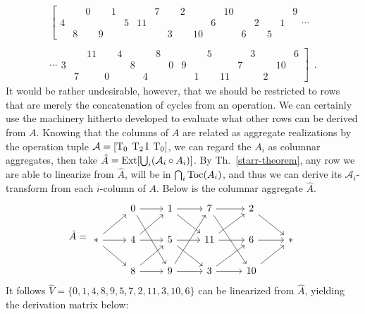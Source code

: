 \begin{example}
    \begin{multline}
        \left[
        \begin{array}{cccccccccccc|cccccc}
        	&& 0 && 1 &&& 7 && 2 && & 10 &&&&& 9 \\
        	4 &&&&& 5 & 11 &&&&& 6 & && 2 && 1 & \\
        	& 8 && 9 &&&&& 3 && 10 & & & 6 && 5 &&
        \end{array}
        \right. \cdots \\\\
        \cdots \left.
        \begin{array}{cccccc|cccccccccccc}
        	&& 11 && 4 & & & 8 &&&& 5 &&& 3 &&& 6 \\
        	3 &&&&& 8 & && 0 & 9 &&&& 7 &&& 10 & \\
        	& 7 && 0 && & 4 &&&& 1 && 11 &&& 2 &&
        \end{array}
        \right] \enspace.
    \end{multline}
    It would be rather undesirable, however, that we should be restricted to rows that are merely the concatenation of cycles from an operation. We can certainly use the machinery hitherto developed to evaluate what other rows can be derived from $A$. Knowing that the columns of $A$ are related as aggregate realizations by the operation tuple $\mathcal{A} = [\operatorname{T}_0 \; \operatorname{T}_2\operatorname{I} \; \operatorname{T}_0]$, we can regard the $A_i$ as columnar aggregates, then take $\hat{A} = \operatorname{Ext}[\bigcup_i(\mathcal{A}_i \circ A_i)]$. By Th.~\ref{starr-theorem}, any row we are able to linearize from $\hat{A}$, will be in $\bigcap_i \operatorname{Toc}(A_i)$, and thus we can derive its $\mathcal{A}_i$-transform from each $i$-column of $A$. Below is the columnar aggregate $\hat{A}$.
    \begin{equation}
        \hat{A} = \begin{tikzcd}
            & 0 \arrow[r] \arrow[ddr] & 1 \arrow[r] \arrow[dr] & 7 \arrow[r] \arrow[ddr] & 2 \arrow[dr] & \\
            * \arrow[r] \arrow[dr] \arrow[ur] & 4 \arrow[r] \arrow[ur] & 5 \arrow[r] \arrow[dr] & 11 \arrow[r] \arrow[ur] & 6 \arrow[r] & * \\
            & 8 \arrow[r] \arrow[ur] & 9 \arrow[r] \arrow[uur] & 3 \arrow[r] \arrow[ur] & 10 \arrow[ur] &
        \end{tikzcd}
    \end{equation}
    It follows $\hat{V} = \{ 0, 1, 4, 8, 9, 5, 7, 2, 11, 3, 10, 6 \}$ can be linearized from $\hat{A}$, yielding the derivation matrix below:
    \begin{multline}

\end{multline}
\end{example}
